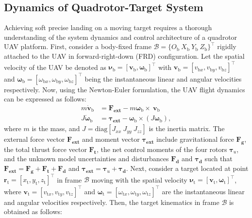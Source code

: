 \documentclass[lettersize,journal]{IEEEtran}
\begin{document}
\subsection{Dynamics of Quadrotor-Target System} \label{quadrotor dynamics: section}
Achieving soft precise landing on a moving target requires a thorough understanding of the system dynamics and control architecture of a quadrotor UAV platform. 
First, consider a body-fixed frame $\mathcal{B}=\{O_{\text{b}} ~X_{\text{b}} ~Y_{\text{b}} ~Z_{\text{b}}\}^{\top}$ rigidly attached to the UAV in forward-right-down (FRD) configuration.
Let the spatial velocity of the UAV be denoted as $\boldsymbol{\nu}_{\text{b}} = [\boldsymbol{v}_{\text{b}}, \boldsymbol{\omega}_{\text{b}}]^{\top}$ with $\boldsymbol{v}_{\text{b}} = [v_{\text{b}x}, v_{\text{b}y}, v_{\text{b}z}]^{\top}$ and $\boldsymbol{\omega}_{\text{b}} = [\omega_{\text{b}x}, \omega_{\text{b}y}, \omega_{\text{b}z}]^{\top}$ being the instantaneous linear and angular velocities respectively.
Now, using the Newton-Euler formulation, the UAV flight dynamics can be expressed as follows:
\begin{align}
\label{quadrotor dynamics: equation}
    m \dot{\boldsymbol{v}}_{\text{b}} &= \boldsymbol{F_{\text{ext}}} - m \boldsymbol{\omega}_{\text{b}} \times ~\boldsymbol{v}_{\text{b}}  \nonumber \\
    J \dot{\boldsymbol{\omega}}_{\text{b}} &= \boldsymbol{\tau_{\text{ext}}} - \boldsymbol{\omega}_{\text{b}} \times (J \boldsymbol{\omega}_{\text{b}}),
\end{align}
where $m$ is the mass,  and $J = \text{diag}[J_{xx}~J_{yy}~J_{zz}]$ is the inertia matrix. The external force vector $\boldsymbol{F_{\text{ext}}}$ and moment vector $\boldsymbol{\tau_{\text{ext}}}$ include gravitational force $\boldsymbol{F_{\text{g}}}$, the total thrust force vector $\boldsymbol{F_{\text{t}}}$, the net control moments of the four rotors $\boldsymbol{\tau}_u$, and the unknown model uncertainties and disturbances $\boldsymbol{F_{\text{d}}}$ and $\boldsymbol{\tau_{\text{d}}}$ such that
$\boldsymbol{F_{\text{ext}}} = \boldsymbol{F_{\text{g}}} + \boldsymbol{F_{\text{t}}} + \boldsymbol{F_{\text{d}}}$ and $\boldsymbol{\tau_{\text{ext}}} = \boldsymbol{\tau}_u + \boldsymbol{\tau_{\text{d}}}$.
Next, consider a target located at point $\boldsymbol{r}_{\text{t}} = [x_{\text{t}}, y_{\text{t}}, z_{\text{t}}]^{\top}$ in frame $\mathcal{B}$ moving with the spatial velocity $\boldsymbol{\nu}_{\text{t}} = [\boldsymbol{v}_{\text{t}}, \boldsymbol{\omega}_{\text{t}}]^{\top}$, where $\boldsymbol{v}_{\text{t}} = [v_{\text{t}x}, v_{\text{t}y}, v_{\text{t}z}]^{\top}$ and $\boldsymbol{\omega}_{\text{t}} = [\omega_{\text{t}x}, \omega_{\text{t}y}, \omega_{\text{t}z}]^{\top}$ are the instantaneous linear and angular velocities respectively. Then, the target kinematics in frame $\mathcal{B}$ is obtained as follows:
\end{document}
